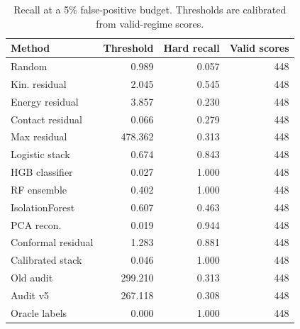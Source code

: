\begin{table}[t]
\centering
\caption{Recall at a 5\% false-positive budget. Thresholds are calibrated from valid-regime scores.}
\label{tab:fixed-fpr}
\scriptsize
\begin{tabular}{lrrr}
\toprule
Method & Threshold & Hard recall & Valid scores \\
\midrule
Random & 0.989 & 0.057 & 448 \\
Kin. residual & 2.045 & 0.545 & 448 \\
Energy residual & 3.857 & 0.230 & 448 \\
Contact residual & 0.066 & 0.279 & 448 \\
Max residual & 478.362 & 0.313 & 448 \\
Logistic stack & 0.674 & 0.843 & 448 \\
HGB classifier & 0.027 & 1.000 & 448 \\
RF ensemble & 0.402 & 1.000 & 448 \\
IsolationForest & 0.607 & 0.463 & 448 \\
PCA recon. & 0.019 & 0.944 & 448 \\
Conformal residual & 1.283 & 0.881 & 448 \\
Calibrated stack & 0.046 & 1.000 & 448 \\
Old audit & 299.210 & 0.313 & 448 \\
Audit v5 & 267.118 & 0.308 & 448 \\
Oracle labels & 0.000 & 1.000 & 448 \\
\bottomrule
\end{tabular}
\end{table}
